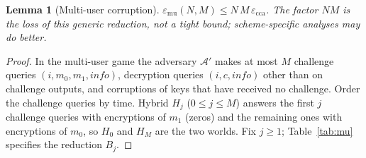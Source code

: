 \documentclass[pdflatex,sn-mathphys-num]{sn-jnl}%
\theoremstyle{plain}
\newtheorem{lemma}[theorem]{Lemma}
\theoremstyle{definition}
\begin{document}
\begin{lemma}[Multi-user corruption]\label{lem:mu}
$\varepsilon_{\mathrm{mu}}(N,M)\le N\,M\,\varepsilon_{\mathrm{cca}}$. The factor $NM$ is the loss of this generic reduction, not a tight bound; scheme-specific analyses may do better.
\end{lemma}
\begin{proof}
In the multi-user game the adversary $\mathcal A'$ makes at most $M$ challenge queries $(i,m_0,m_1,\mathit{info})$, decryption queries $(i,c,\mathit{info})$ other than on challenge outputs, and corruptions of keys that have received no challenge. Order the challenge queries by time. Hybrid $H_j$ ($0\le j\le M$) answers the first $j$ challenge queries with encryptions of $m_1$ (zeros) and the remaining ones with encryptions of $m_0$, so $H_0$ and $H_M$ are the two worlds. Fix $j\ge1$; Table~\ref{tab:mu} specifies the reduction $B_j$.


\end{proof}
\end{document}
